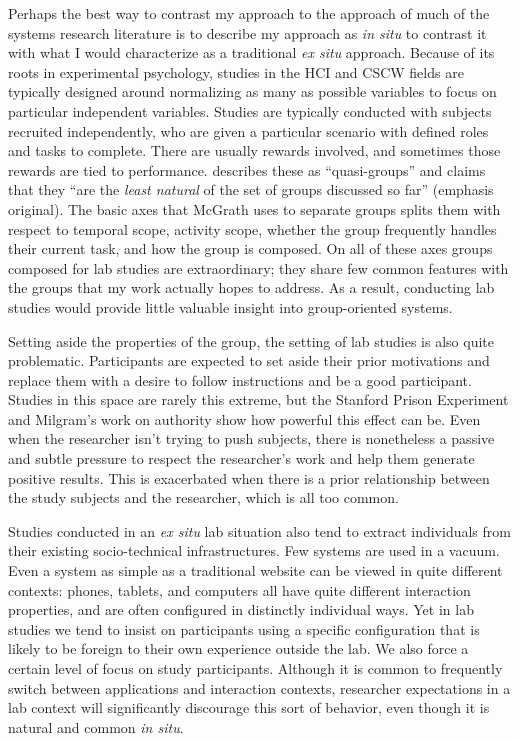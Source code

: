 Perhaps the best way to contrast my approach to the approach of much of the systems research literature is to describe my approach as \emph{in situ} to contrast it with what I would characterize as a traditional \emph{ex situ} approach. Because of its roots in experimental psychology, studies in the HCI and CSCW fields are typically designed around normalizing as many as possible variables to focus on particular independent variables. Studies are typically conducted with subjects recruited independently, who are given a particular scenario with defined roles and tasks to complete. There are usually rewards involved, and sometimes those rewards are tied to performance. \citet{McGrath:1984un} describes these as ``quasi-groups'' and claims that they ``are the \emph{least natural} of the set of groups discussed so far'' (emphasis original). The basic axes that McGrath uses to separate groups splits them with respect to temporal scope, activity scope, whether the group frequently handles their current task, and how the group is composed. On all of these axes groups composed for lab studies are extraordinary; they share few common features with the groups that my work actually hopes to address. As a result, conducting lab studies would provide little valuable insight into group-oriented systems.


Setting aside the properties of the group, the setting of lab studies is also quite problematic. Participants are expected to set aside their prior motivations and replace them with a desire to follow instructions and be a good participant. Studies in this space are rarely this extreme, but the Stanford Prison Experiment \citep{Haney:1973wf} and Milgram's work on authority \citep{Milgram:1983vh} show how powerful this effect can be. Even when the researcher isn't trying to push subjects, there is nonetheless a passive and subtle pressure to respect the researcher's work and help them generate positive results. This is exacerbated when there is a prior relationship between the study subjects and the researcher, which is all too common. 

Studies conducted in an \emph{ex situ} lab situation also tend to extract individuals from their existing socio-technical infrastructures. Few systems are used in a vacuum. Even a system as simple as a traditional website can be viewed in quite different contexts: phones, tablets, and computers all have quite different interaction properties, and are often configured in distinctly individual ways. Yet in lab studies we tend to insist on participants using a specific configuration that is likely to be foreign to their own experience outside the lab. We also force a certain level of focus on study participants. Although it is common to frequently switch between applications and interaction contexts, researcher expectations in a lab context will significantly discourage this sort of behavior, even though it is natural and common \emph{in situ}. 

